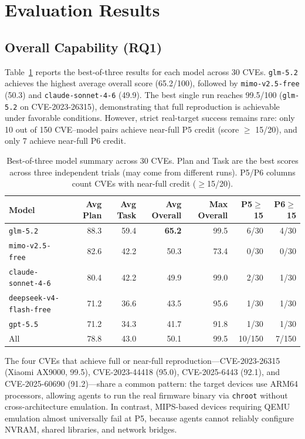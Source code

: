 \section{Evaluation Results}
\label{sec:results}

\subsection{Overall Capability (RQ1)}
Table~\ref{tab:model-results} reports the best-of-three results for each model across 30 CVEs. \texttt{glm-5.2} achieves the highest average overall score (65.2/100), followed by \texttt{mimo-v2.5-free} (50.3) and \texttt{claude-sonnet-4-6} (49.9). The best single run reaches 99.5/100 (\texttt{glm-5.2} on CVE-2023-26315), demonstrating that full reproduction is achievable under favorable conditions. However, strict real-target success remains rare: only 10 out of 150 CVE--model pairs achieve near-full P5 credit (score $\geq$ 15/20), and only 7 achieve near-full P6 credit.

\begin{table}[t]
\centering
\caption{Best-of-three model summary across 30 CVEs. Plan and Task are the best scores across three independent trials (may come from different runs). P5/P6 columns count CVEs with near-full credit ($\geq$15/20).}
\label{tab:model-results}
\small
\begin{tabular}{lrrrrrr}
\toprule
Model & Avg Plan & Avg Task & Avg Overall & Max Overall & P5$\geq$15 & P6$\geq$15 \\
\midrule
\texttt{glm-5.2} & 88.3 & 59.4 & \textbf{65.2} & 99.5 & 6/30 & 4/30 \\
\texttt{mimo-v2.5-free} & 82.6 & 42.2 & 50.3 & 73.4 & 0/30 & 0/30 \\
\texttt{claude-sonnet-4-6} & 80.4 & 42.2 & 49.9 & 99.0 & 2/30 & 1/30 \\
\texttt{deepseek-v4-flash-free} & 71.2 & 36.6 & 43.5 & 95.6 & 1/30 & 1/30 \\
\texttt{gpt-5.5} & 71.2 & 34.3 & 41.7 & 91.8 & 1/30 & 1/30 \\
\midrule
All & 78.8 & 43.0 & 50.1 & 99.5 & 10/150 & 7/150 \\
\bottomrule
\end{tabular}
\end{table}

The four CVEs that achieve full or near-full reproduction---CVE-2023-26315 (Xiaomi AX9000, 99.5), CVE-2023-44418 (95.0), CVE-2025-6443 (92.1), and CVE-2025-60690 (91.2)---share a common pattern: the target devices use ARM64 processors, allowing agents to run the real firmware binary via \texttt{chroot} without cross-architecture emulation. In contrast, MIPS-based devices requiring QEMU emulation almost universally fail at P5, because agents cannot reliably configure NVRAM, shared libraries, and network bridges.


